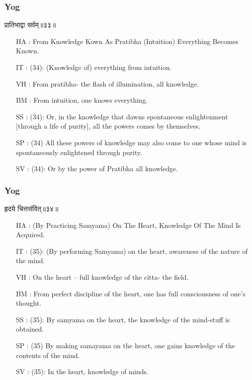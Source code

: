 \begin{frame}[fragile]\frametitle{Yog}
\begin{sanskrit}
प्रातिभाद्वा सर्वम्॥३३॥
\end{sanskrit}

	\begin{itemize}
	\item [HA]: From Knowledge Kown As Pratibha (Intuition) Everything Becomes Known.
	\item [IT]: (34): (Knowledge of) everything from intuition.
	\item [VH]: From pratibha- the flash of illumination, all knowledge.
	\item [BM]: From intuition, one knows everything.
	\item [SS]: (34): Or, in the knowledge that dawns spontaneous enlightenment [through a life of purity], all the powers comes by themselves.
	\item [SP]: (34) All these powers of knowledge may also come to one whose mind is spontaneously enlightened through purity.
	\item [SV]: (34): Or by the power of Pratibha all knowledge. 
	\end{itemize}
\end{frame}

\begin{frame}[fragile]\frametitle{Yog}
\begin{sanskrit}
हृदये चित्तसंवित्॥३४॥
\end{sanskrit}

	\begin{itemize}
	\item [HA]: (By Practicing Samyama) On The Heart, Knowledge Of The Mind Is Acquired.
	\item [IT]: (35): (By performing Samyama) on the heart, awareness of the nature of the mind.
	\item [VH]: On the heart – full knowledge of the citta- the field.
	\item [BM]: From perfect discipline of the heart, one has full consciousness of one’s thought.
	\item [SS]: (35): By samyama on the heart, the knowledge of the mind-stuff is obtained.
	\item [SP]: (35) By making samayama on the heart, one gains knowledge of the contents of the mind.
	\item [SV]: (35): In the heart, knowledge of minds. 
	\end{itemize}
\end{frame}


